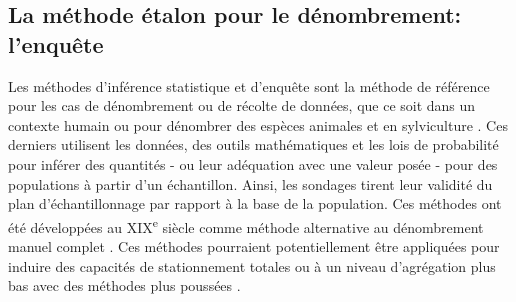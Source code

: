     
    \subsection{La méthode étalon pour le dénombrement: l'enquête}\label{sec:statistical-inference}
        Les méthodes d'inférence statistique et d'enquête sont la méthode de référence pour les cas de dénombrement ou de récolte de données, que ce soit dans un contexte humain \parencite{ardilly_techniques_2006,tille_theorie_2019} ou pour dénombrer des espèces animales \parencite{rhodes_relative_2015} et en sylviculture \parencite{methot_guide_2014}. Ces derniers utilisent les données, des outils mathématiques et les lois de probabilité pour inférer des quantités - ou leur adéquation avec une valeur posée - pour des populations à partir d'un échantillon. Ainsi, les sondages tirent leur validité du plan d'échantillonnage par rapport à la base de la population. Ces méthodes ont été développées au XIX\textsuperscript{e} siècle comme méthode alternative au dénombrement manuel complet \parencite{ardilly_techniques_2006}. Ces méthodes pourraient potentiellement être appliquées pour induire des capacités de stationnement totales ou à un niveau d'agrégation plus bas avec des méthodes plus poussées \parencite{ghosh_small_1994}. 
